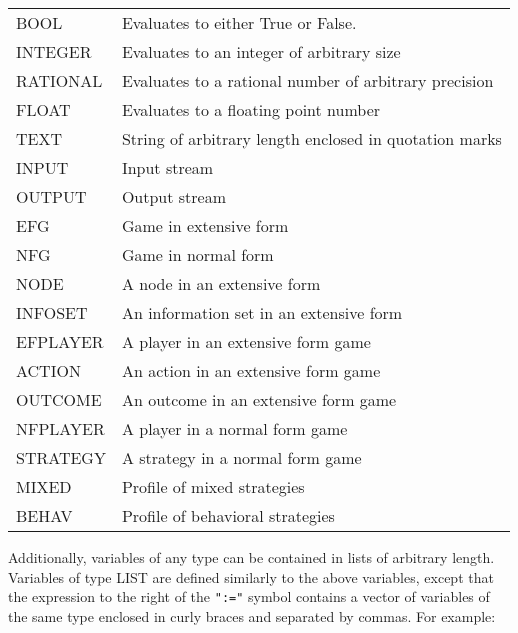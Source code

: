\begin{tabular}{lp{4in}}
BOOL & Evaluates to either True or False. \\ 

INTEGER & Evaluates to an integer of arbitrary size \\ 

RATIONAL & Evaluates to a rational number of arbitrary precision\\ 

FLOAT 	& Evaluates to a floating point number \\

TEXT	& String of arbitrary length enclosed in quotation marks\\ 

INPUT & Input stream \\

OUTPUT & Output stream \\

EFG	& Game in extensive form\\

NFG	& Game in normal form\\

NODE	& A node in an extensive form\\

INFOSET & An information set in an extensive form \\

EFPLAYER & A player in an extensive form game \\

ACTION & An action in an extensive form game \\

OUTCOME & An outcome in an extensive form game \\

NFPLAYER & A player in a normal form game \\

STRATEGY & A strategy in a normal form game\\

MIXED	& Profile of mixed strategies\\

BEHAV	& Profile of behavioral strategies\\
\end{tabular}

\medskip

\noindent
Additionally, variables of any type can be contained in lists of arbitrary
length.
Variables of type LIST are defined similarly to the above variables,
except that the expression to the right of the {\tt ":="} symbol
contains a vector of variables of the same type enclosed in curly braces
and separated by commas.  For example:

